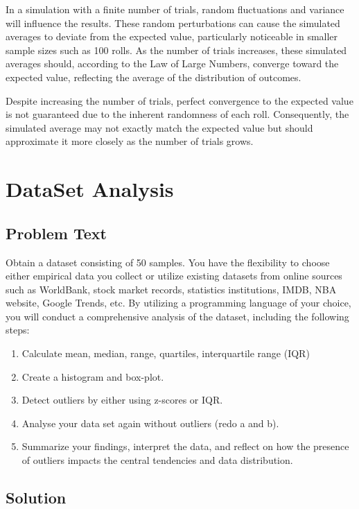\documentclass[a4paper, 10pt]{article}
\begin{document}
                In a simulation with a finite number of trials, random fluctuations and variance will influence the results. These random perturbations can cause the simulated averages to deviate from the expected value, particularly noticeable in smaller sample sizes such as 100 rolls. As the number of trials increases, these simulated averages should, according to the Law of Large Numbers, converge toward the expected value, reflecting the average of the distribution of outcomes.

                Despite increasing the number of trials, perfect convergence to the expected value is not guaranteed due to the inherent randomness of each roll. Consequently, the simulated average may not exactly match the expected value but should approximate it more closely as the number of trials grows.

    \pagebreak

    \section{DataSet Analysis}
        \subsection{Problem Text}
            Obtain a dataset consisting of 50 samples. You have the flexibility to choose either empirical data you collect or utilize existing datasets from online sources such as WorldBank, stock market records, statistics institutions, IMDB, NBA website, Google Trends, etc. By utilizing a programming language of your choice, you will conduct a comprehensive analysis of the dataset, including the following steps:
            \begin{enumerate}
                \item Calculate mean, median, range, quartiles, interquartile range (IQR)
                \item Create a histogram and box-plot.
                \item Detect outliers by either using z-scores or IQR.
                \item Analyse your data set again without outliers (redo a and b).
                \item Summarize your findings, interpret the data, and reflect on how the presence of outliers impacts the central tendencies and data distribution.
            \end{enumerate}

        \subsection{Solution}
\end{document}
